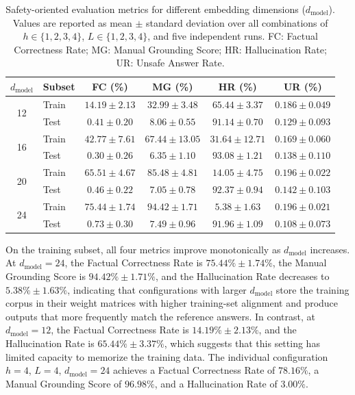 \documentclass{ieeeaccess}
\begin{document}
\begin{table}[htbp]
\small
\centering
\caption{Safety-oriented evaluation metrics for different embedding dimensions ($d_{\mathrm{model}}$). Values are reported as mean $\pm$ standard deviation over all combinations of $h\in\{1,2,3,4\}$, $L\in\{1,2,3,4\}$, and five independent runs. FC: Factual Correctness Rate; MG: Manual Grounding Score; HR: Hallucination Rate; UR: Unsafe Answer Rate.\\}
\label{tab:safety_metrics}
\begin{tabular}{clcccc}
\toprule
$d_\text{model}$ & Subset & FC (\%) & MG (\%) & HR (\%) & UR (\%) \\
\midrule
\multirow{2}{*}{12} & Train & $14.19 \pm 2.13$ & $32.99 \pm 3.48$ & $65.44 \pm 3.37$ & $0.186 \pm 0.049$ \\
                    & Test  & $0.41 \pm 0.20$  & $8.06 \pm 0.55$  & $91.14 \pm 0.70$ & $0.129 \pm 0.093$ \\
\midrule
\multirow{2}{*}{16} & Train & $42.77 \pm 7.61$ & $67.44 \pm 13.05$ & $31.64 \pm 12.71$ & $0.169 \pm 0.060$ \\
                    & Test  & $0.30 \pm 0.26$  & $6.35 \pm 1.10$   & $93.08 \pm 1.21$  & $0.138 \pm 0.110$ \\
\midrule
\multirow{2}{*}{20} & Train & $65.51 \pm 4.67$ & $85.48 \pm 4.81$ & $14.05 \pm 4.75$ & $0.196 \pm 0.022$ \\
                    & Test  & $0.46 \pm 0.22$  & $7.05 \pm 0.78$  & $92.37 \pm 0.94$ & $0.142 \pm 0.103$ \\
\midrule
\multirow{2}{*}{24} & Train & $75.44 \pm 1.74$ & $94.42 \pm 1.71$ & $5.38 \pm 1.63$  & $0.196 \pm 0.021$ \\
                    & Test  & $0.73 \pm 0.30$  & $7.49 \pm 0.96$  & $91.96 \pm 1.09$ & $0.108 \pm 0.073$ \\
\bottomrule
\end{tabular}
\end{table}



On the training subset, all four metrics improve monotonically as $d_\text{model}$ increases. At $d_\text{model}=24$, the Factual Correctness Rate is $75.44\%\pm1.74\%$, the Manual Grounding Score is $94.42\%\pm1.71\%$, and the Hallucination Rate decreases to $5.38\%\pm1.63\%$, indicating that configurations with larger $d_\text{model}$ store the training corpus in their weight matrices with higher training-set alignment and produce outputs that more frequently match the reference answers. In contrast, at $d_\text{model}=12$, the Factual Correctness Rate is $14.19\%\pm2.13\%$, and the Hallucination Rate is $65.44\%\pm3.37\%$, which suggests that this setting has limited capacity to memorize the training data. The individual configuration $h=4$, $L=4$, $d_\text{model}=24$ achieves a Factual Correctness Rate of $78.16\%$, a Manual Grounding Score of $96.98\%$, and a Hallucination Rate of $3.00\%$.
\end{document}

